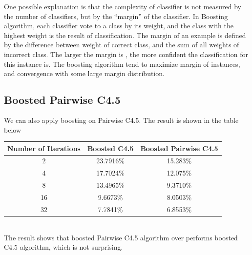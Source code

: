 \documentclass[a4paper,11pt]{article}
\begin{document}
One possible explanation is that the complexity of classifier is not measured by the number of classifiers, but by the ``margin'' of the classifier.
In Boosting algorithm, each classifier vote to a class by its weight, and the class with the highest weight is the result of classification. The margin of an example is defined by the difference between weight of correct class, and the sum of all weights of incorrect class. The larger the margin is , the more confident the classification for this instance is. The boosting algorithm tend to maximize margin of instances, and convergence with some large margin distribution\cite{boosting}.\\
\subsection{Boosted Pairwise C4.5}
We can also apply boosting on Pairwise C4.5. The result is shown in the table below
\vspace{0.5cm}
\begin{tabular}{c c c}
Number of Iterations	& Boosted C4.5 & Boosted Pairwise C4.5\\
\hline \hline
	2		& 23.7916\% & 15.283\%  \\
	4		& 17.7024\% & 12.075\%  \\
	8		& 13.4965\% & 9.3710\%  \\
	16		& 9.6673\%  & 8.0503\%  \\
    32      & 7.7841\%  & 6.8553\%\\
\end{tabular}
\vspace{0.5cm}\\
The result shows that boosted Pairwise C4.5 algorithm over performs boosted C4.5 algorithm, which is not surprising.\\
\end{document}
